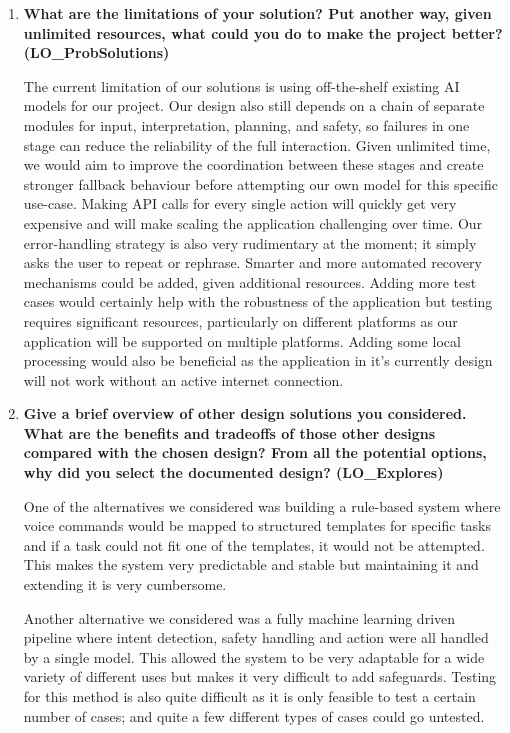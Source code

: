 \documentclass[12pt, titlepage]{article}
\begin{document}
\begin{enumerate}
\item \textbf{What are the limitations of your solution? Put another way,
given unlimited resources, what could you do to make the project
better? (LO\_ProbSolutions)}

The current limitation of our solutions is using off-the-shelf existing AI models
for our project. Our design also still depends on a chain of separate modules for
input, interpretation, planning, and safety, so failures in one stage can reduce
the reliability of the full interaction. Given unlimited time, we would aim to
improve the coordination between these stages and create stronger fallback behaviour
before attempting our own model for this specific use-case. Making API calls for every single
action will quickly get very expensive and will make scaling the application
challenging over time.
Our error-handling strategy is also very rudimentary at the moment; it simply
asks the user to repeat or rephrase. Smarter and more automated recovery
mechanisms could be added, given additional resources.
Adding more test cases would certainly help with the robustness of the
application but testing requires significant resources, particularly on
different platforms as our application will be supported on multiple platforms.
Adding some local processing would also be beneficial as the application in it's
currently design will not work without an active internet connection.

\item \textbf{Give a brief overview of other design solutions you
considered. What are the benefits and tradeoffs of those other
designs compared with the chosen design? From all the potential
options, why did you select the documented design? (LO\_Explores)}

One of the alternatives we considered was building a rule-based system where
voice commands would be mapped to structured templates for specific tasks and if
a task could not fit one of the templates, it would not be attempted. This makes
the system very predictable and stable but maintaining it and extending it is
very cumbersome.

Another alternative we considered was a fully machine learning driven pipeline
where intent detection, safety handling and action were all handled by a single
model. This allowed the system to be very adaptable for a wide variety of
different uses but makes it very difficult to add safeguards. Testing for this
method is also quite difficult as it is only feasible to test a certain number
of cases; and quite a few different types of cases could go untested.


\end{enumerate}
\end{document}
